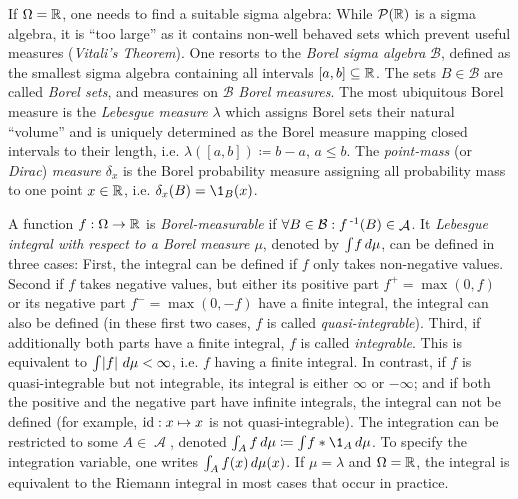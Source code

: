 \documentclass[a4paper]{scrreprt}
\DeclareMathOperator{\A}{\mathcal{A}}
\newcommand{\B}{\mathcal{B}}
\theoremstyle{definition}
\begin{document}
    If $\Omega = \mathbb{R}$, one needs to find a suitable sigma algebra: While $\operatorname{\mathcal{P}}(\mathbb{R})$ is a sigma algebra, it is “too large” as it contains non-well behaved sets which prevent useful measures (\emph{Vitali's Theorem}).
    One resorts to the \emph{Borel sigma algebra} $\B$, defined as the smallest sigma algebra containing all intervals $[a, b] \subseteq \mathbb{R}$.
    The sets $B \in \B$ are called \emph{Borel sets}, and measures on $\B$ \emph{Borel measures}.
    The most ubiquitous Borel measure is the \emph{Lebesgue measure} $\lambda$ which assigns Borel sets their natural “volume” and is uniquely determined as the Borel measure mapping closed intervals to their length, i.e. $\lambda([a, b]) \coloneqq b-a$, $a \leq b$.
    The \emph{point-mass} (or \emph{Dirac}) \emph{measure} $\delta_x$ is the Borel probability measure assigning all probability mass to one point $x \in \mathbb{R}$, i.e. $\delta_x(B) = \1_B(x)$.

    A function $f: \Omega \to \mathbb{R}$ is \emph{Borel-measurable} if $\forall B \in \B: f\inv(B) \in \A$.
    It \emph{Lebesgue integral with respect to a Borel measure $\mu$}, denoted by $\int_{} f \, d\mu$, can be defined in three cases:
    First, the integral can be defined if $f$ only takes non-negative values.
    Second if $f$ takes negative values, but either its positive part $f^+ = \max(0, f)$ or its negative part $f^- = \max(0, -f)$ have a finite integral, the integral can also be defined (in these first two cases, $f$ is called \emph{quasi-integrable}).
    Third, if additionally both parts have a finite integral, $f$ is called \emph{integrable}. This is equivalent to $\int_{} \left| f \right| \, d\mu < \infty$, i.e. $f$ having a finite integral.
    In contrast, if $f$ is quasi-integrable but not integrable, its integral is either $\infty$ or $-\infty$; and if both the positive and the negative part have infinite integrals, the integral can not be defined (for example, $\operatorname{id}: x \mapsto x$ is not quasi-integrable).
    The integration can be restricted to some $A \in \A$, denoted $\lintegral{A}{f}{\mu} \coloneqq \lintegral{}{f*\1_A}{\mu}$. To specify the integration variable, one writes $\int_{A} f(x) \, d\mu(x)$.
    If $\mu = \lambda$ and $\Omega = \mathbb{R}$, the integral is equivalent to the Riemann integral in most cases that occur in practice.
    
    
\end{document}
